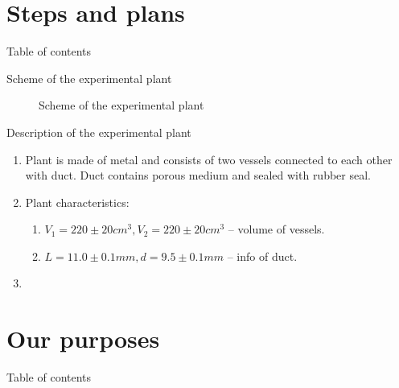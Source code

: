 \documentclass[a4paper]{beamer}
\begin{document}
	\frame{\maketitle}

	\section{Steps and plans}\label{sec:steps-and-plans}
	\begin{frame}{Table of contents}
		\tableofcontents[currentsection]
	\end{frame}

	\begin{frame}{Scheme of the experimental plant}
		\begin{figure}
			\caption{Scheme of the experimental plant}\label{fig:plant}
		\end{figure}
	\end{frame}

	\begin{frame}{Description of the experimental plant}
		\begin{enumerate}
			\item<1-> Plant is made of metal and consists of two vessels connected to each other with
			duct.
			Duct contains porous medium and sealed with rubber seal.
			\item<2-> Plant characteristics:
			\begin{enumerate}
				\item $V_1=220 \pm 20 cm^3, V_2=220 \pm 20 cm^3$ -- volume of vessels.
				\item $L = 11.0 \pm 0.1 mm, d = 9.5 \pm 0.1 mm$ -- info of duct.
			\end{enumerate}
			\item<3->
		\end{enumerate}
	\end{frame}


	\section{Our purposes}\label{sec:our-purposes}
	\begin{frame}{Table of contents}
		\tableofcontents[currentsection]
	\end{frame}

	\begin{frame}{}

	\end{frame}
\end{document}
